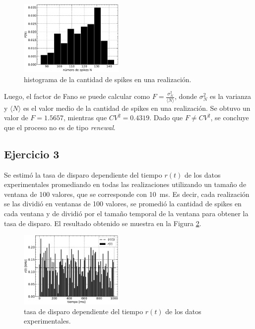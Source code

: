 \documentclass[11pt, twocolumn]{article}
\begin{document}
{\begin{figure} [htbp]
    \centering
    \includegraphics[width=0.45\textwidth]{figures/spikes_count.pdf}
    \caption{histograma de la cantidad de spikes en una realización.}
    \label{fig:histogram_Nspikes}
\end{figure}

Luego, el factor de Fano se puede calcular como \(F = \frac{\sigma^2_N}{\langle N \rangle}\), donde \(\sigma^2_N\) es la varianza y \(\langle N \rangle\) es el valor medio de la cantidad de spikes en una realización. Se obtuvo un valor de \(F = 1.5657\), mientras que \(CV^2 = 0.4319\). Dado que \(F \neq CV^2\), se concluye que el proceso no es de tipo \textit{renewal}.

\subsection*{Ejercicio 3}
Se estimó la tasa de disparo dependiente del tiempo \(r(t)\) de los datos experimentales promediando en todas las realizaciones utilizando un tamaño de ventana de 100 valores, que se corresponde con \SI{10}{\milli\second}. Es decir, cada realización se las dividió en ventanas de 100 valores, se promedió la cantidad de spikes en cada ventana y de dividió por el tamaño temporal de la ventana para obtener la tasa de disparo. El resultado obtenido se muestra en la Figura \ref{fig:rate}.

\begin{figure} [htbp]
    \centering
    \includegraphics[width=0.45\textwidth]{figures/rate.pdf}
    \caption{tasa de disparo dependiente del tiempo \(r(t)\) de los datos experimentales.}
    \label{fig:rate}
\end{figure}

}
\end{document}
